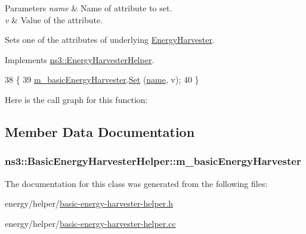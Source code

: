 \begin{DoxyParams}{Parameters}
{\em name} & Name of attribute to set. \\
\hline
{\em v} & Value of the attribute.\\
\hline
\end{DoxyParams}
Sets one of the attributes of underlying \hyperlink{classns3_1_1EnergyHarvester}{Energy\+Harvester}. 

Implements \hyperlink{classns3_1_1EnergyHarvesterHelper_ac66d65adbe46b6edb84049f3b080de0f}{ns3\+::\+Energy\+Harvester\+Helper}.


\begin{DoxyCode}
38 \{
39   \hyperlink{classns3_1_1BasicEnergyHarvesterHelper_a2f541bc84df124acb2f5fa6c6f43b1b9}{m\_basicEnergyHarvester}.\hyperlink{classns3_1_1ObjectFactory_aef5c0d5019c96bdf01cefd1ff83f4a68}{Set} (\hyperlink{generate__test__data__lte__spectrum__model_8m_ab74e6bf80237ddc4109968cedc58c151}{name}, v);
40 \}
\end{DoxyCode}


Here is the call graph for this function\+:




\subsection{Member Data Documentation}
\subsubsection[{\texorpdfstring{m\+\_\+basic\+Energy\+Harvester}{m_basicEnergyHarvester}}]{ ns3\+::\+Basic\+Energy\+Harvester\+Helper\+::m\+\_\+basic\+Energy\+Harvester\hspace{0.3cm}{\ttfamily [private]}}\hypertarget{classns3_1_1BasicEnergyHarvesterHelper_a2f541bc84df124acb2f5fa6c6f43b1b9}{}\label{classns3_1_1BasicEnergyHarvesterHelper_a2f541bc84df124acb2f5fa6c6f43b1b9}


The documentation for this class was generated from the following files\+:\begin{DoxyCompactItemize}
\item 
energy/helper/\hyperlink{basic-energy-harvester-helper_8h}{basic-\/energy-\/harvester-\/helper.\+h}\item 
energy/helper/\hyperlink{basic-energy-harvester-helper_8cc}{basic-\/energy-\/harvester-\/helper.\+cc}\end{DoxyCompactItemize}
